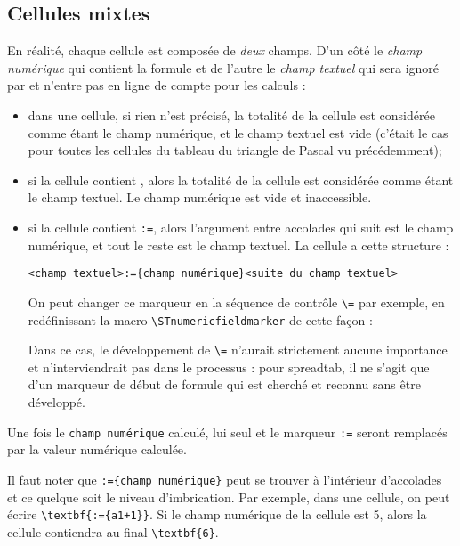 \documentclass[a4paper,10pt]{article}
\newcommand\verbinline[1][]{\lstinline[breaklines=false,basicstyle=\normalsize\ttfamily,#1]}
\newcommand\ST{\textsf{spreadtab}\xspace}
\newcommand\falseverb[1]{\texttt{\detokenize{#1}}}
\begin{document}
\subsection{Cellules mixtes}
En réalité, chaque cellule est composée de \emph{deux} champs. D'un côté le \emph{champ numérique} qui contient la formule et de l'autre le \emph{champ textuel} qui sera ignoré par \falseverb{fp} et n'entre pas en ligne de compte pour les calculs :
\begin{itemize}
	\item dans une cellule, si rien n'est précisé, la totalité de la cellule est considérée comme étant le champ numérique, et le champ textuel est vide (c'était le cas pour toutes les cellules du tableau du triangle de Pascal vu précédemment);
	\item si la cellule contient \og\falseverb{@}\fg{}, alors la totalité de la cellule est considérée comme étant le champ textuel. Le champ numérique est vide et inaccessible.
	\item si la cellule contient \og\verb-:=-\fg, alors l'argument entre accolades qui suit est le champ numérique, et tout le reste est le champ textuel. La cellule a cette structure :\par\smallskip
		\hfil\verb-<champ textuel>:={champ numérique}<suite du champ textuel>-\hfil\null\par\smallskip
	On peut changer ce marqueur en la séquence de contrôle \og\verb-\=-\fg{} par exemple, en redéfinissant la macro \verbinline-\STnumericfieldmarker- de cette façon :\par\smallskip{\centering
		\verbinline-\renewcommand\STnumericfieldmarker{\=}-\par\smallskip}
	Dans ce cas, le développement de \verb-\=- n'aurait strictement aucune importance et n'interviendrait pas dans le processus : pour \ST, il ne s'agit que d'un marqueur de début de formule qui est cherché et reconnu sans être développé.
\end{itemize}
Une fois le \og\verb-champ numérique-\fg{} calculé, lui seul et le marqueur \og\verb-:=-\fg{} seront remplacés par la valeur numérique calculée.

Il faut noter que \og\verb-:={champ numérique}-\fg{} peut se trouver à l'intérieur d'accolades et ce quelque soit le niveau d'imbrication. Par exemple, dans une cellule, on peut écrire \verb-\textbf{:={a1+1}}-. Si le champ numérique de la cellule \falseverb{a1} est 5, alors la cellule contiendra au final \verb-\textbf{6}-.
\end{document}
